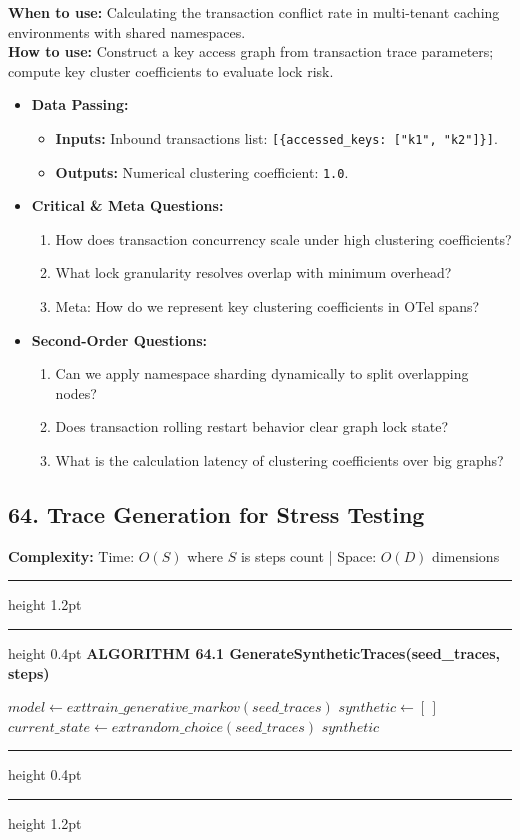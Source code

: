 \documentclass[11pt,a4paper]{article}
\newenvironment{textbookalgo}[2]{%
  \par\addvspace{1.2em}\noindent
  \hrule height 1.2pt
  \vspace{1.5pt}
  \hrule height 0.4pt
  \vspace{5pt}
  {\noindent\large\bfseries\sffamily ALGORITHM #1 \quad #2}
  \par\vspace{5pt}
  \RestyleAlgo{plain}
}{%
  \par\vspace{4pt}
  \hrule height 0.4pt
  \vspace{1.5pt}
  \hrule height 1.2pt
  \par\addvspace{1.2em}
}
\theoremstyle{definition}
\begin{document}
\noindent
\textbf{When to use:} Calculating the transaction conflict rate in multi-tenant caching environments with shared namespaces.\\
\textbf{How to use:} Construct a key access graph from transaction trace parameters; compute key cluster coefficients to evaluate lock risk.
\begin{itemize}[leftmargin=*]
  \item[] \textbf{Data Passing:}
    \begin{itemize}
      \item \textbf{Inputs:} Inbound transactions list: \texttt{[\{accessed\_keys: ["k1", "k2"]\}]}.
      \item \textbf{Outputs:} Numerical clustering coefficient: \texttt{1.0}.
    \end{itemize}
  \item[] \textbf{Critical \& Meta Questions:}
  \begin{enumerate}
    \item How does transaction concurrency scale under high clustering coefficients?
    \item What lock granularity resolves overlap with minimum overhead?
    \item Meta: How do we represent key clustering coefficients in OTel spans?
  \end{enumerate}
  \item[] \textbf{Second-Order Questions:}
  \begin{enumerate}
    \item Can we apply namespace sharding dynamically to split overlapping nodes?
    \item Does transaction rolling restart behavior clear graph lock state?
    \item What is the calculation latency of clustering coefficients over big graphs?
  \end{enumerate}
\end{itemize}
\medskip

\clearpage
\subsection{64. Trace Generation for Stress Testing}


\noindent
\textbf{Complexity:} Time: $O(S)$ where $S$ is steps count | Space: $O(D)$ dimensions
\smallskip

\begin{textbookalgo}{64.1}{GenerateSyntheticTraces(seed\_traces, steps)}
\begin{algorithm}[H]
$model \leftarrow 	ext{train\_generative\_markov}(seed\_traces)$\;
$synthetic \leftarrow [\,]$\;
$current\_state \leftarrow 	ext{random\_choice}(seed\_traces)$\;
\Return $synthetic$\;
\end{algorithm}
\end{textbookalgo}
\end{document}
